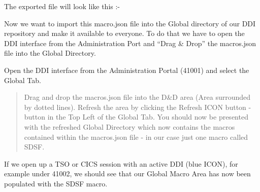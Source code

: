 \documentclass[letterpaper,10pt,english]{sphinxmanual}
\begin{document}
The exported file will look like this :-

\begin{sphinxVerbatim}[commandchars=\\\{\}]
\PYG{p}{[}\PYG{p}{[}\PYG{p}{]}\PYG{p}{]}
\end{sphinxVerbatim}

Now we want to import this macro.json file into the Global directory of our DDI repository and make it available to everyone. To do that we have to open the DDI interface from the Administration Port and “Drag \& Drop” the macros.json file into the Global Directory.

Open the DDI interface from the Administration Portal (41001) and select the Global Tab.

\begin{quote}

Drag and drop the macros.json file into the D\&D area (Area surrounded by dotted lines). Refresh the area by clicking the Refresh ICON button - button in the Top Left of the Global Tab. You should now be presented with the refreshed Global Directory which now contains the macros contained within the macros.json file - in our case just one macro called SDSF.
\end{quote}


If we open up a TSO or CICS session with an active DDI (blue ICON), for example under 41002, we should see that our Global Macro Area has now been populated with the SDSF macro.
\end{document}
